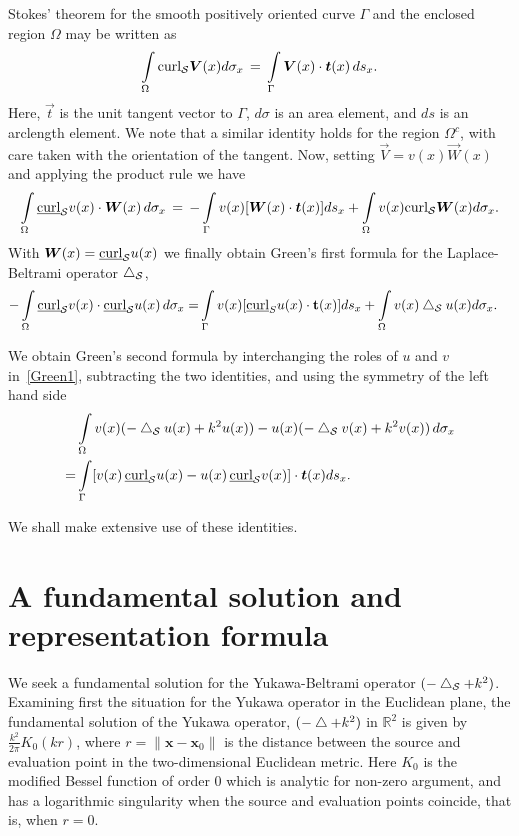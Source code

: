 Stokes' theorem for the  smooth positively oriented curve $\Gamma$ and
the enclosed region $\Omega$ may be written  as
\begin{align*}
  \int\limits_{\Omega} \mbox{curl}_{\S} \vec{V}(x) d\sigma_x \, = \,
  \int\limits_\Gamma \vec{V}(x) \cdot \vec{t}(x) \, ds_x .
\end{align*}
Here, $\vec{t}$ is the unit tangent vector to $\Gamma$, $d\sigma$ is an
area element, and $ds$ is an arclength element. We note that a similar
identity holds for the region $\Omega^{c}$, with care taken with the
orientation of the tangent.  Now, setting $\vec{V} = v(x) \vec{W}(x)$
and applying the product rule we have
\begin{align*}
  \int\limits_{\Omega} \underline{\mbox{curl}}_{\S} v(x) \cdot
  \vec{W}(x) \, d\sigma_x \, = \, 
  -\int\limits_{\Gamma} v(x) [\vec{W}(x) \cdot \vec{t}(x)] ds_x +
  \int\limits_{\Omega} v(x) \mbox{curl}_{\S} \vec{W}(x) d\sigma_x .
\end{align*}
With $\vec{W}(x) = \underline{\mbox{curl}}_{\S} u(x)$ we finally
obtain Green's first formula for the Laplace-Beltrami operator
$\bigtriangleup_{\mathcal{S}}$,
\begin{align}
  \label{Green1}
  -\int\limits_{\Omega} \underline{\mbox{curl}}_{\mathcal{S}} v(x) \cdot
  \underline{\mbox{curl}}_{\mathcal{S}} u(x) \, d\sigma_x 
  =& \int\limits_{\Gamma} v(x) [\underline{\mbox{curl}}_S u(x) \cdot 
  \mathbf{t}(x)] ds_x +\int\limits_{\Omega} v(x) \bigtriangleup_{\mathcal{S}}u(x) d\sigma_x.
\end{align}

We obtain Green's second formula by interchanging the roles of $u$ and
$v$ in~\eqref{Green1}, subtracting the two identities, and using the
symmetry of the left hand side
\begin{align}
  &\int\limits_{\Omega} v(x)(-\lap_{\S}u(x) + k^2 u(x))-
  u(x)(-\lap_{\S}v(x) +k^2v(x))\, d\sigma_x \nonumber \\
  =&\int\limits_\Gamma [v(x)\,\underline{\mbox{curl}}_{\S} 
  u(x) - u(x)\, \underline{\mbox{curl}}_{\S}v(x)] \cdot 
  \vec{t}(x) ds_x.
  \label{Green2}
\end{align}

We shall make extensive use of these identities.


\section{A fundamental solution and representation formula}
We seek a fundamental solution for the Yukawa-Beltrami operator
$(-\bigtriangleup_{\mathcal{S}} + k^2)$.  Examining first the situation for the Yukawa
operator in the Euclidean plane, the fundamental solution of the Yukawa
operator, $(-\bigtriangleup + k^2)$ in $\mathbb{R}^2$ is given by
$\frac{k^2}{2\pi} K_{0}(kr)$, where $r=\|\mathbf{x} - \mathbf{x}_{0}\|$
is the distance between the source and evaluation point in the
two-dimensional Euclidean metric. Here $K_{0}$ is the modified Bessel
function of order 0 which is analytic for non-zero argument, and has a
logarithmic singularity when the source and evaluation points coincide,
that is, when $r=0$.

